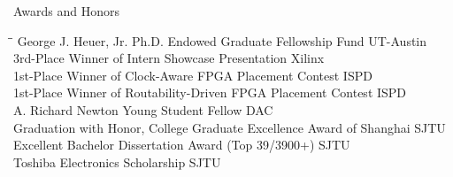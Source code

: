 
\begin{rSection}{Awards and Honors}
\begin{tabbing}
\hspace{4.55in}\= \hspace{1.95in}\= \kill
George J. Heuer, Jr. Ph.D. Endowed Graduate Fellowship Fund \> UT-Austin  \\
3rd-Place Winner of Intern Showcase Presentation \> Xilinx  \\
1st-Place Winner of Clock-Aware FPGA Placement Contest \> ISPD  \\
1st-Place Winner of Routability-Driven FPGA Placement Contest \> ISPD  \\
A. Richard Newton Young Student Fellow \> DAC  \\
Graduation with Honor, College Graduate Excellence Award of Shanghai \> SJTU  \\
Excellent Bachelor Dissertation Award (Top 39/3900+) \> SJTU  \\
Toshiba Electronics Scholarship \> SJTU  \\

\end{tabbing}
\end{rSection}


